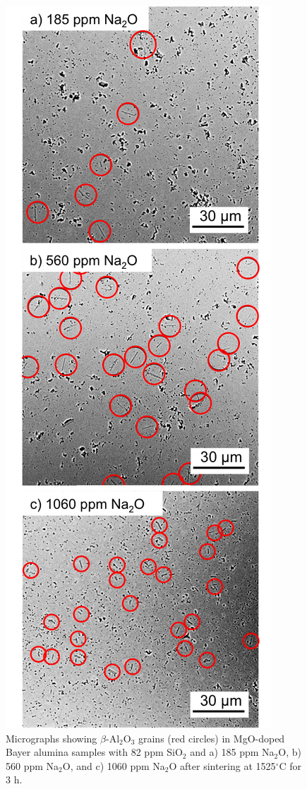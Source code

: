 \newpage
\begin{figure}[H]
	\centering
	\includegraphics[scale=0.84]{Chapter-5/Figures/Figure5.png}
	\caption{Micrographs showing $\beta$-Al$_{2}$O$_{3}$ grains (red circles) in MgO-doped Bayer alumina samples with 82 ppm SiO$_{2}$ and a) 185 ppm Na$_{2}$O, b) 560 ppm Na$_{2}$O, and c) 1060 ppm Na$_{2}$O after sintering at 1525$^{\circ}$C for 3 h.}
	\label{Ch5-figure:Figure5}
\end{figure}

